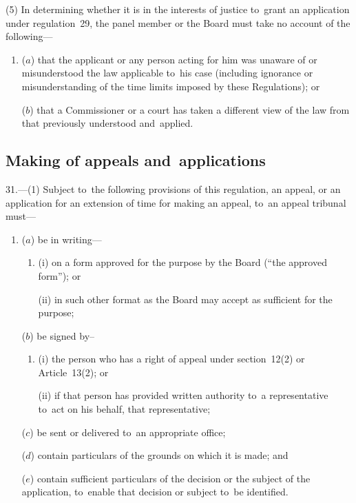 \documentclass[12pt,a4paper]{article}
\begin{document}
(5) In determining whether it is in the interests of justice to~grant an application under regulation~29, the panel member or the Board must take no account of the following—
\begin{enumerate}\item[]
($a$) that the applicant or any person acting for him was unaware of or misunderstood the law applicable to~his case (including ignorance or misunderstanding of the time limits imposed by these Regulations); or

($b$) that a Commissioner or a court has taken a different view of the law from that previously understood and~applied.
\end{enumerate}

\subsection[31. Making of appeals and~applications]{Making of appeals and~applications}

31.---(1)  Subject to~the following provisions of this regulation, an appeal, or an application for an extension of time for making an appeal, to~an appeal tribunal must—
\begin{enumerate}\item[]
($a$) be in writing—
\begin{enumerate}\item[]
(i) on a form approved for the purpose by the Board (“the approved form”); or

(ii) in such other format as the Board may accept as sufficient for the purpose;
\end{enumerate}

($b$) be signed by–
\begin{enumerate}\item[]
(i) the person who has a right of appeal under section~12(2) or Article~13(2); or

(ii) if that person has provided written authority to~a representative to~act on his behalf, that representative;
\end{enumerate}

($c$) be sent or delivered to~an appropriate office;

($d$) contain particulars of the grounds on which it is made; and

($e$) contain sufficient particulars of the decision or the subject of the application, to~enable that decision or subject to~be identified.
\end{enumerate}
\end{document}

